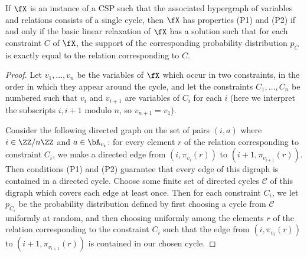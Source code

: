 \begin{thm} If $\fX$ is an instance of a CSP such that the associated hypergraph of variables and relations consists of a single cycle, then $\fX$ has properties (P1) and (P2) if and only if the basic linear relaxation of $\fX$ has a solution such that for each constraint $C$ of $\fX$, the support of the corresponding probability distribution $p_C$ is exactly equal to the relation corresponding to $C$.
\end{thm}
\begin{proof} Let $v_1, ..., v_n$ be the variables of $\fX$ which occur in two constraints, in the order in which they appear around the cycle, and let the constraints $C_1, ..., C_n$ be numbered such that $v_i$ and $v_{i+1}$ are variables of $C_i$ for each $i$ (here we interpret the subscripts $i, i+1$ modulo $n$, so $v_{n+1} = v_1$).

Consider the following directed graph on the set of pairs $(i,a)$ where $i \in \ZZ/n\ZZ$ and $a \in \bA_{v_i}$: for every element $r$ of the relation corresponding to constraint $C_i$, we make a directed edge from $(i,\pi_{v_i}(r))$ to $(i+1,\pi_{v_{i+1}}(r))$. Then conditions (P1) and (P2) guarantee that every edge of this digraph is contained in a directed cycle. Choose some finite set of directed cycles $\mathcal{C}$ of this digraph which covers each edge at least once. Then for each constraint $C_i$, we let $p_{C_i}$ be the probability distribution defined by first choosing a cycle from $\mathcal{C}$ uniformly at random, and then choosing uniformly among the elements $r$ of the relation corresponding to the constraint $C_i$ such that the edge from $(i,\pi_{v_i}(r))$ to $(i+1,\pi_{v_{i+1}}(r))$ is contained in our chosen cycle.
\begin{comment}
Consider the following Markov chain on the set of pairs $(i,a)$ where $i \in [n]$ and $a \in \bA_{v_i}$: from a given pair $(i,a)$, we either stay where we are with probability $1/2$ (this is just to ensure that the Markov chain is aperiodic), or we pick a random element $r$ of the relation $\RR_i$ corresponding to constraint $C_i$ such that the $v_i$-coordinate of $r$ is $a$ (choosing uniformly from the set of such $r$), and move to the pair $(i+1,b)$, where $b \in \bA_{v_{i+1}}$ is the projection of $r$ onto the $v_{i+1}$-coordinate.

The condition (P1) guarantees that there is always at least one choice $r$ available, and the condition (P2) guarantees that this Markov chain is recurrent. Since we ensured that the Markov chain is aperiodic, we can apply the Perron-Frobenius theorem (\cite{perron-matrix}, \cite{frobenius-matrix}) to see that following the Markov chain will tend towards a steady state distribution. If we start by picking uniformly among the pairs $(i,a)$ and follow the Markov chain from then on, then the limiting steady state distribution gives us a solution to the linear programming relaxation with the desired properties.
\end{comment}
\end{proof}

